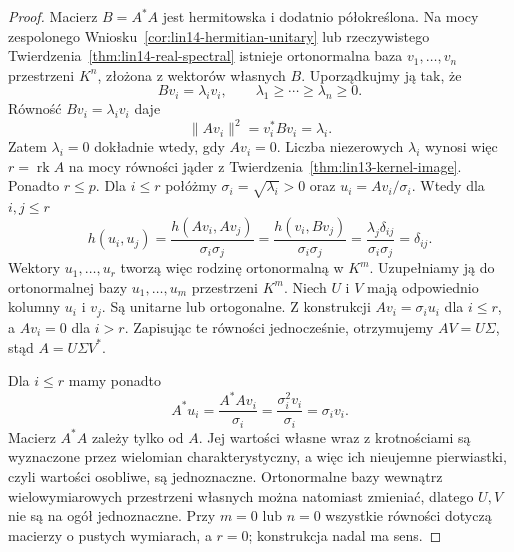 \begin{proof}
Macierz \(B=A^*A\) jest
hermitowska i dodatnio półokreślona.
Na mocy zespolonego
Wniosku~\ref{cor:lin14-hermitian-unitary}
lub rzeczywistego
Twierdzenia~\ref{thm:lin14-real-spectral}
istnieje ortonormalna baza
\(v_1,\ldots,v_n\) przestrzeni \(K^n\),
złożona z wektorów własnych \(B\).
Uporządkujmy ją tak, że
\[
 Bv_i=\lambda_i v_i,\qquad
 \lambda_1\ge\cdots\ge\lambda_n\ge0.
\]
Równość \(Bv_i=\lambda_i v_i\)
daje
\[
 \|Av_i\|^2=v_i^*Bv_i=\lambda_i.
\]
Zatem \(\lambda_i=0\)
dokładnie wtedy, gdy \(Av_i=0\).
Liczba niezerowych \(\lambda_i\)
wynosi więc
\(r=\operatorname{rk}A\)
na mocy równości jąder
z
Twierdzenia~\ref{thm:lin13-kernel-image}.
Ponadto \(r\le p\).
Dla \(i\le r\) połóżmy
\(\sigma_i=\sqrt{\lambda_i}>0\)
oraz \(u_i=Av_i/\sigma_i\).
Wtedy dla \(i,j\le r\)
\[
 h(u_i,u_j)
 =\frac{h(Av_i,Av_j)}{\sigma_i\sigma_j}
 =\frac{h(v_i,Bv_j)}{\sigma_i\sigma_j}
 =\frac{\lambda_j\delta_{ij}}
        {\sigma_i\sigma_j}
 =\delta_{ij}.
\]
Wektory \(u_1,\ldots,u_r\)
tworzą więc rodzinę ortonormalną
w \(K^m\). Uzupełniamy ją
do ortonormalnej bazy
\(u_1,\ldots,u_m\) przestrzeni \(K^m\).
Niech \(U\) i \(V\)
mają odpowiednio kolumny
\(u_i\) i \(v_j\).
Są unitarne lub ortogonalne.
Z konstrukcji
\(Av_i=\sigma_i u_i\) dla \(i\le r\),
a \(Av_i=0\) dla \(i>r\).
Zapisując te równości
jednocześnie, otrzymujemy
\(AV=U\Sigma\), stąd
\(A=U\Sigma V^*\).

Dla \(i\le r\) mamy ponadto
\[
 A^*u_i
 =\frac{A^*Av_i}{\sigma_i}
 =\frac{\sigma_i^2 v_i}{\sigma_i}
 =\sigma_i v_i.
\]
Macierz \(A^*A\) zależy
tylko od \(A\).
Jej wartości własne wraz
z krotnościami są wyznaczone
przez wielomian charakterystyczny,
a więc ich nieujemne pierwiastki,
czyli wartości osobliwe,
są jednoznaczne.
Ortonormalne bazy wewnątrz
wielowymiarowych przestrzeni
własnych można natomiast zmieniać,
dlatego \(U,V\) nie są
na ogół jednoznaczne.
Przy \(m=0\) lub \(n=0\)
wszystkie równości dotyczą
macierzy o pustych wymiarach,
a \(r=0\); konstrukcja
nadal ma sens.
\end{proof}

